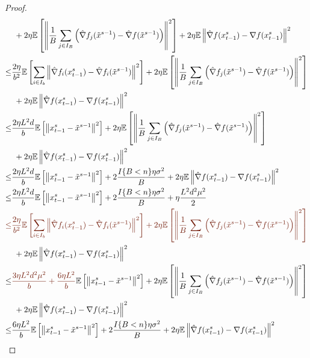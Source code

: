 \documentclass{article}
\newcommand*{\E}{\mathbb{E}}
\newcommand{\norm}[1]{\left\lVert#1\right\rVert}
\theoremstyle{definition}
\theoremstyle{remark}
\begin{document}
\begin{proof}
\begin{align}
   &\,\, \label{var-estimate-lem-3}+ 2\eta \E \left[ \norm{\frac{1}{B}\sum_{j\in I_B}\left(\hat{\nabla} f_j(\tilde{x}^{s-1}) - \hat{\nabla} f(\tilde{x}^{s-1})\right)}^2\right]+2\eta \E \norm{\hat{\nabla} f(x_{t-1}^s)-\nabla f(x_{t-1}^s)}^2\\
   \leq  &\frac{2\eta}{b^2}\E\left[\sum_{i\in I_b}\norm{\hat{\nabla} f_i(x_{t-1}^s)-\hat{\nabla} f_i(\tilde{x}^{s-1})}^2\right]+ 2\eta \E \left[ \norm{\frac{1}{B}\sum_{j\in I_B}\left(\hat{\nabla} f_j(\tilde{x}^{s-1}) - \hat{\nabla} f(\tilde{x}^{s-1})\right)}^2\right]\notag\\
   &\,\,\label{var-estimate-lem-4}+2\eta \E \norm{\hat{\nabla} f(x_{t-1}^s)-\nabla f(x_{t-1}^s)}^2\\
    \leq  &\frac{2\eta L^2 d}{b}\E\left[\norm{x_{t-1}^s-\tilde{x}^{s-1}}^2\right]+ 2\eta \E \left[ \norm{\frac{1}{B}\sum_{j\in I_B}\left(\hat{\nabla} f_j(\tilde{x}^{s-1}) - \hat{\nabla} f(\tilde{x}^{s-1})\right)}^2\right]\notag\\
   &\,\,\label{var-estimate-lem-5}+2\eta \E \norm{\hat{\nabla} f(x_{t-1}^s)-\nabla f(x_{t-1}^s)}^2\\
   \leq  &\label{var-estimate-lem-6}\frac{2\eta L^2 d}{b}\E\left[\norm{x_{t-1}^s-\tilde{x}^{s-1}}^2\right]+ 2\frac{I\{B < n\}\eta \sigma ^2}{B}+2\eta \E \norm{\hat{\nabla} f(x_{t-1}^s)-\nabla f(x_{t-1}^s)}^2\\
   \leq  &\label{var-estimate-lem-7}\frac{2\eta L^2 d}{b}\E\left[\norm{x_{t-1}^s-\tilde{x}^{s-1}}^2\right]+ 2\frac{I\{B < n\}\eta \sigma ^2}{B}+\eta \frac{L^2 d^2 \mu^2}{2}\\
      {\color{Brown}
   \leq } &{\color{Brown}\frac{2\eta}{b^2}\E\left[\sum_{i\in I_b}\norm{\hat{\nabla} f_i(x_{t-1}^s)-\hat{\nabla} f_i(\tilde{x}^{s-1})}^2\right]+ 2\eta \E \left[ \norm{\frac{1}{B}\sum_{j\in I_B}\left(\hat{\nabla} f_j(\tilde{x}^{s-1}) - \hat{\nabla} f(\tilde{x}^{s-1})\right)}^2\right]}\notag\\
   &\,\,\label{var-estimate-lem-4}+2\eta \E \norm{\hat{\nabla} f(x_{t-1}^s)-\nabla f(x_{t-1}^s)}^2\\
    \leq  &{\color{Brown}\frac{3 \eta L^2 d^2 \mu^2}{b} + \frac{6\eta L^2}{b}}\E\left[\norm{x_{t-1}^s-\tilde{x}^{s-1}}^2\right]+ 2\eta \E \left[ \norm{\frac{1}{B}\sum_{j\in I_B}\left(\hat{\nabla} f_j(\tilde{x}^{s-1}) - \hat{\nabla} f(\tilde{x}^{s-1})\right)}^2\right]\notag\\
   &\,\,\label{var-estimate-lem-5}+2\eta \E \norm{\hat{\nabla} f(x_{t-1}^s)-\nabla f(x_{t-1}^s)}^2\\
   \leq  &\label{var-estimate-lem-6}\frac{6\eta L^2}{b}\E\left[\norm{x_{t-1}^s-\tilde{x}^{s-1}}^2\right]+ 2\frac{I\{B < n\}\eta \sigma ^2}{B}+2\eta \E \norm{\hat{\nabla} f(x_{t-1}^s)-\nabla f(x_{t-1}^s)}^2\\

\end{align}
\end{proof}
\end{document}
